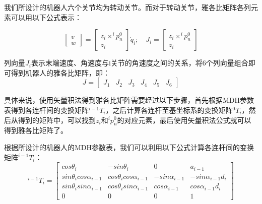我们所设计的机器人六个关节均为转动关节。而对于转动关节，雅各比矩阵各列元素可以用以下公式表示：

\begin{equation}
    \begin{bmatrix}
        v\\
        w
    \end{bmatrix}=\begin{bmatrix}
        z_i \times ^ip_n^0\\
        z_i
    \end{bmatrix} \dot{q}_i; \quad  J_i =\begin{bmatrix}
        z_i \times ^ip_n^0\\
        z_i
    \end{bmatrix}
\end{equation}

列向量$J_i$表示末端速度、角速度与i关节的角速度之间的关系，将6个列向量组合即可得到机器人的雅各比矩阵，即：
\begin{equation}
    J=\begin{bmatrix}
        J_1 & J_2 & J_3 & J_4 & J_5 & J_6
    \end{bmatrix}
\end{equation}

具体来说，使用矢量积法得到雅各比矩阵需要经过以下步骤，首先根据MDH参数表得到各连杆间的变换矩阵${^{i-1}T}_i$，之后计算各连杆至基坐标系的变换矩阵${^0T}_i$，然后从得到的矩阵中，可以找到$z_i$和$^ip_n^0$的对应元素，最后使用矢量积法公式就可以得到雅各比矩阵了。

根据所设计的机器人的MDH参数表，我们可以利用以下公式计算各连杆间的变换矩阵${^{i-1}T}_i$：
\begin{equation}
    {^{i-1}T}_i=\begin{bmatrix}
        cos \theta_i & -sin \theta_i & 0 & a_{i-1}\\
        sin \theta_i cos \alpha_{i-1} & cos \theta_i cos \alpha_{i-1} & -sin \alpha_{i-1} & -sin \alpha_{i-1}d_i\\
        sin \theta_i sin \alpha_{i-1} & cos \theta_i sin \alpha_{i-1} & cos \alpha_{i-1} & cos \alpha_{i-1}d_i\\
        0 & 0 & 0 & 1
    \end{bmatrix}
\end{equation}

